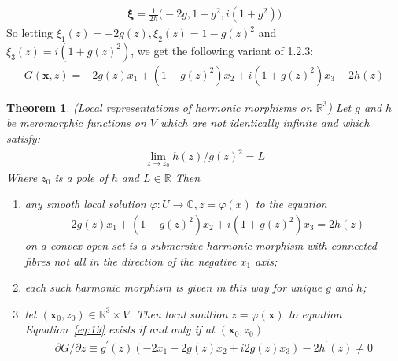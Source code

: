 \documentclass[12pt]{article}
\newtheorem{theorem}{Theorem}[section]
\theoremstyle{definition}
\numberwithin{equation}{subsection}
\begin{document}
\begin{align}\label{eq:17}
    \boldsymbol{\xi} = \frac{1}{2h}\big(-2g, 1 - g^2, i(1+g^2)    \big)
\end{align}
So letting $\xi_1(z) = -2g(z), \xi_2(z) = 1 - g(z)^2$ and $\xi_3(z) = i(1+g(z)^2)$, we get the following variant of 1.2.3:
\begin{align}\label{eq:18}
G(\boldsymbol{x} , z) = -2g(z) x_1 + (1 - g(z)^2) x_2 + i(1 + g(z)^2) x_3 - 2h(z)
\end{align}
\begin{theorem}
(Local representations of harmonic morphisms on $\mathbb{R}^3$) Let $g$ and $h$ be meromorphic functions on $V$ which are not identically infinite and which satisfy:
\begin{align}\label{eq:18}
    \lim _{z\rightarrow z_0} h(z)/g(z)^2 = L
\end{align}
Where $z_0$ is a pole of $h$ and $L \in \mathbb{R}$
Then \begin{enumerate}
    \item any smooth local solution $\varphi:U \rightarrow \mathbb{C}, z = \varphi(x)$ to the equation
    \begin{align}\label{eq:19}
        -2g(z) x_1 + (1 - g(z)^2) x_2 + i(1 + g(z)^2) x_3 = 2h(z)
    \end{align}
    on a convex open set is a submersive harmonic morphism with connected fibres not all in the direction of the negative $x_1$ axis;
    \item each such harmonic morphism is given in this way for unique $g$ and $h$;
    \item let $(\boldsymbol{x}_0, z_0) \in \mathbb{R}^3 \times V$. Then local soultion $z = \varphi(\mathbf{x})$ to equation Equation~\ref{eq:19} exists if and only if at $(\boldsymbol{x}_0, z_0)$
    \begin{align}\label{eq:20}
        \partial G/ \partial z \equiv g^{'}(z)(-2 x_1 - 2 g(z) x_2 + i 2g(z) x_3) - 2h^{'}(z) \neq 0
    \end{align}
    
\end{enumerate}
\end{theorem}

\end{document}
